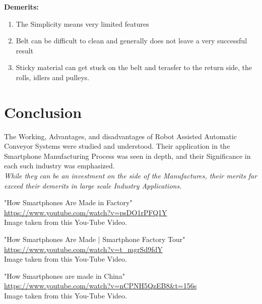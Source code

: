 \documentclass[11pt]{article}
\begin{document}
\textbf{Demerits:}
\begin{enumerate}
	\item The Simplicity means very limited features
	\item Belt can be difficult to clean and generally does not leave a very successful result
	\item Sticky material can get stuck on the belt and terasfer to the return side, the rolls, idlers and pulleys. 
\end{enumerate}


\section{Conclusion}
	
The Working, Advantages, and disadvantages of Robot Assisted Automatic Conveyor Systems were studied and understood. Their application in the Smartphone Manufacturing Process was seen in depth, and their Significance in each such industry was emphasized. \\
\textit{While they can be an investment on the side of the Manufactures, their merits far exceed their demerits in large scale Industry Applications.}



\pagebreak
\begin{thebibliography}{}


"How Smartphones Are Made in Factory"\\
\url{https://www.youtube.com/watch?v=psDO1rPFQ1Y}\\
Image taken from this You-Tube Video.
	
"How Smartphones Are Made | Smartphone Factory Tour"\\
\url{https://www.youtube.com/watch?v=t_mgrSd9fdY}\\
Image taken from this You-Tube Video.

"How Smartphones are made in China"\\
\url{https://www.youtube.com/watch?v=nCPNH5QzEB8&t=156s}\\
Image taken from this You-Tube Video.

	
	
\end{thebibliography}
	
	
\end{document}
